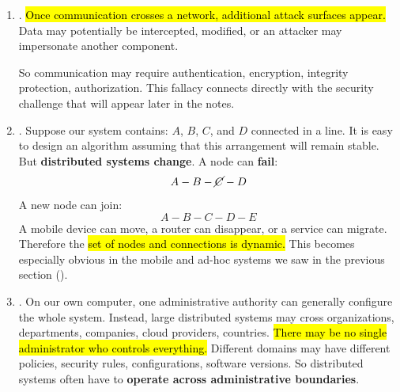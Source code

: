 \begin{enumerate}
        Imagine $1000$ machines constantly sending gigabytes of state to each other. Even if every CPU is mostly idle, the system can still perform badly because the \textbf{network capacity is a resource}. This is one reason distributed algorithms often try to reduce communication.

    \item {}. \hl{Once communication crosses a network, additional attack surfaces appear.} Data may potentially be intercepted, modified, or an attacker may impersonate another component.

        So communication may require authentication, encryption, integrity protection, authorization. This fallacy connects directly with the security challenge that will appear later in the notes.

    \item {}. Suppose our system contains: $A$, $B$, $C$, and $D$ connected in a line. It is easy to design an algorithm assuming that this arrangement will remain stable. But \textbf{distributed systems change}. A node can \textbf{fail}:
        \begin{equation*}
            A-B-\cancel C-D
        \end{equation*}
        A new node can join:
        \begin{equation*}
            A-B-C-D-E
        \end{equation*}
        A mobile device can move, a router can disappear, or a service can migrate. Therefore the \hl{set of nodes and connections is dynamic.} This becomes especially obvious in the mobile and ad-hoc systems we saw in the previous section ().

    \item {}. On our own computer, one administrative authority can generally configure the whole system. Instead, large distributed systems may cross organizations, departments, companies, cloud providers, countries. \hl{There may be no single administrator who controls everything.} Different domains may have different policies, security rules, configurations, software versions. So distributed systems often have to \textbf{operate across administrative boundaries}.


\end{enumerate}
